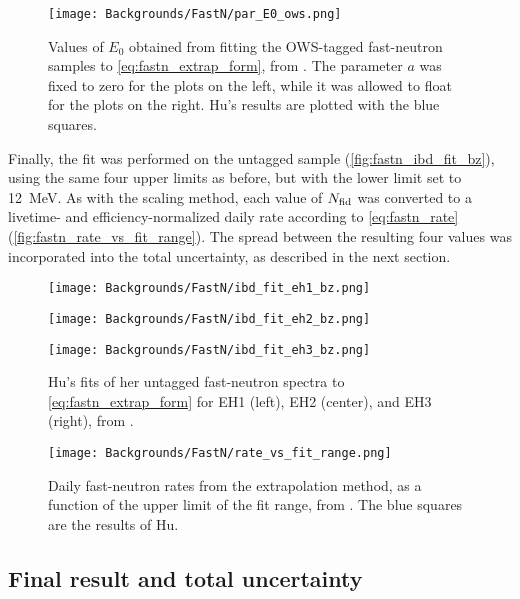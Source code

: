 \documentclass[../thesis.tex]{subfiles}
\begin{document}
\begin{figure}[ht]
  \texttt{[image: Backgrounds/FastN/par\_E0\_ows.png]}
  \caption{Values of $E_0$ obtained from fitting the OWS-tagged fast-neutron samples to \autoref{eq:fastn_extrap_form}, from \cite{fastn}. The parameter $a$ was fixed to zero for the plots on the left, while it was allowed to float for the plots on the right. Hu's results are plotted with the blue squares.}
  \label{fig:fastn_par_E0_ows}
\end{figure}

Finally, the fit was performed on the untagged sample (\autoref{fig:fastn_ibd_fit_bz}), using the same four upper limits as before, but with the lower limit set to 12~MeV.  As with the scaling method, each value of $N_\mathrm{fid}$ was converted to a livetime- and efficiency-normalized daily rate according to \eqref{eq:fastn_rate} (\autoref{fig:fastn_rate_vs_fit_range}). The spread between the resulting four values was incorporated into the total uncertainty, as described in the next section.

\begin{figure}[ht]
  \begin{minipage}{0.333\textwidth}%
    \texttt{[image: Backgrounds/FastN/ibd\_fit\_eh1\_bz.png]}%
  \end{minipage}%
  \begin{minipage}{0.333\textwidth}%
    \texttt{[image: Backgrounds/FastN/ibd\_fit\_eh2\_bz.png]}%
  \end{minipage}%
  \begin{minipage}{0.333\textwidth}%
    \texttt{[image: Backgrounds/FastN/ibd\_fit\_eh3\_bz.png]}%
  \end{minipage}%
  \caption{Hu's fits of her untagged fast-neutron spectra to \autoref{eq:fastn_extrap_form} for EH1 (left), EH2 (center), and EH3 (right), from \cite{fastn}.}
  \label{fig:fastn_ibd_fit_bz}
\end{figure}

\begin{figure}[h]
  \texttt{[image: Backgrounds/FastN/rate\_vs\_fit\_range.png]}
  \caption{Daily fast-neutron rates from the extrapolation method, as a function of the upper limit of the fit range, from \cite{fastn}. The blue squares are the results of Hu.}
  \label{fig:fastn_rate_vs_fit_range}
\end{figure}

\subsection{Final result and total uncertainty}
\label{sec:fastn_comb}
\end{document}
